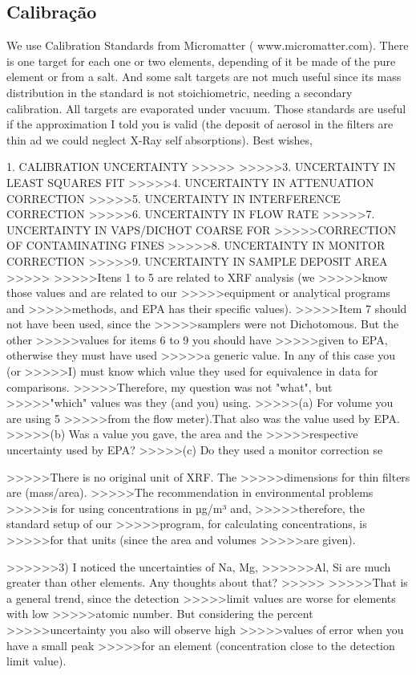 \subsection{Calibração}


We use Calibration
Standards from Micromatter ( www.micromatter.com).
There is one target for each one or two elements,
depending of it be made of the pure element or
from a salt. And some salt targets are not much
useful since its mass distribution in the
standard is not stoichiometric, needing a
secondary calibration. All targets are evaporated
under vacuum. Those standards are useful if the
approximation I told you is valid (the deposit of
aerosol in the filters are thin ad we could neglect X-Ray self absorptions).
Best wishes,

1. CALIBRATION UNCERTAINTY
>>>>>
>>>>>3. UNCERTAINTY IN LEAST SQUARES FIT
>>>>>4. UNCERTAINTY IN ATTENUATION CORRECTION
>>>>>5. UNCERTAINTY IN INTERFERENCE CORRECTION
>>>>>6. UNCERTAINTY IN FLOW RATE
>>>>>7. UNCERTAINTY IN VAPS/DICHOT COARSE FOR
>>>>>CORRECTION OF CONTAMINATING FINES
>>>>>8. UNCERTAINTY IN MONITOR CORRECTION
>>>>>9. UNCERTAINTY IN SAMPLE DEPOSIT AREA
>>>>>
>>>>>Itens 1 to 5 are related to XRF analysis (we
>>>>>know those values and are related to our
>>>>>equipment or analytical programs and
>>>>>methods, and EPA has their specific values).
>>>>>Item 7 should not have been used, since the
>>>>>samplers were not Dichotomous. But the other
>>>>>values for items 6 to 9 you should have
>>>>>given to EPA, otherwise they must have used
>>>>>a generic value. In any of this case you (or
>>>>>I) must know which value they used for equivalence in data for comparisons.
>>>>>Therefore, my question was not "what", but
>>>>>"which" values was they (and you) using.
>>>>>(a)  For volume you are using 5%
>>>>>from the flow meter).That also was the value used by EPA.
>>>>>(b) Was a value you gave, the area and the
>>>>>respective uncertainty used by EPA?
>>>>>(c) Do they used a monitor correction se

>>>>>There is no original unit of XRF. The
>>>>>dimensions for thin filters are (mass/area).
>>>>>The recommendation in environmental problems
>>>>>is for using concentrations in µg/m³ and,
>>>>>therefore, the standard setup of our
>>>>>program, for calculating concentrations, is
>>>>>for that units (since the area and volumes
>>>>>are given).

>>>>>>3) I noticed the uncertainties of Na, Mg,
>>>>>>Al, Si are much greater than other elements. Any thoughts about that?
>>>>>
>>>>>That is a general trend, since the detection
>>>>>limit values are worse for elements with low
>>>>>atomic number. But considering the percent
>>>>>uncertainty you also will observe high
>>>>>values of error when you have a small peak
>>>>>for an element (concentration close to the detection limit value). 


